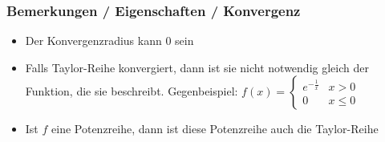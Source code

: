 \subsubsection{Bemerkungen / Eigenschaften / Konvergenz}
\begin{itemize}
	\item Der Konvergenzradius kann 0 sein
	\item Falls Taylor-Reihe konvergiert, dann ist sie nicht notwendig gleich
	der Funktion, die sie beschreibt. Gegenbeispiel:
	$f(x) = \begin{cases}
	e^{-\frac{1}{x}} & x > 0\\
	0 & x \leq 0\end{cases}$
	\item Ist $f$ eine Potenzreihe, dann ist diese Potenzreihe auch die Taylor-Reihe
\end{itemize}